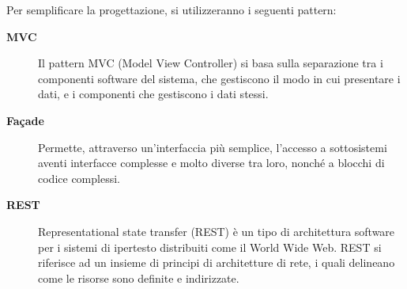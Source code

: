 \documentclass[11pt,a4paper]{article}
\begin{document}
Per semplificare la progettazione, si utilizzeranno i seguenti pattern:
\begin{description}
 \item[\textbf{MVC}] 
Il pattern MVC (Model View Controller) si basa sulla separazione tra i componenti software del sistema, che gestiscono il modo in cui presentare i dati, e i componenti che gestiscono i dati stessi. 
 \item[\textbf{Façade}]
Permette, attraverso un'interfaccia più semplice, l'accesso a sottosistemi aventi interfacce complesse e molto diverse tra loro, nonché a blocchi di codice complessi.
\item[\textbf{REST}]
Representational state transfer (REST) è un tipo di architettura software per i sistemi di ipertesto distribuiti come il World Wide Web. 
REST si riferisce ad un insieme di principi di architetture di rete, i quali delineano come le risorse sono definite e indirizzate.



\end{description}
\end{document}
